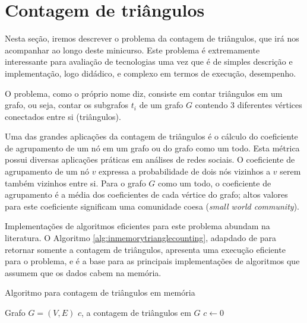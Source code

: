 \section{Contagem de triângulos} \label{triangles}

Nesta seção, iremos descrever o problema da contagem de triângulos, que irá nos acompanhar
ao longo deste minicurso. Este problema é extremamente interessante para avaliação de 
tecnologias uma vez que é de simples descrição e implementação, logo didádico, e complexo
em termos de execução, desempenho.

O problema, como o próprio nome diz, consiste em contar triângulos em um grafo, ou seja,
contar os subgrafos $t_i$ de um grafo $G$ contendo 3 diferentes vértices conectados entre si 
(triângulos). 

Uma das grandes aplicações da contagem de triângulos é o cálculo do coeficiente de agrupamento 
de um nó em um grafo ou do grafo como um todo. Esta métrica possui diversas aplicações práticas 
em análises de redes sociais. O coeficiente de agrupamento de um nó $v$ expressa a probabilidade de 
dois nós vizinhos a $v$ serem também vizinhos entre si. Para o grafo $G$ como um todo, o coeficiente 
de agrupamento é a média dos coeficientes de cada vértice do grafo; altos valores para este coeficiente 
significam uma comunidade coesa (\emph{small world community}).

Implementações de algoritmos eficientes para este problema abundam na literatura. O Algoritmo 
\ref{alg:inmemorytrianglecounting}, adapdado de \cite{Chu2012} para retornar somente a contagem de 
triângulos, apresenta uma execução eficiente para o problema, e é a base para as principais 
implementações de algoritmos que assumem que os dados cabem na memória. 

\begin{algorithm}
\caption{Algoritmo para contagem de triângulos em memória}
\label{alg:inmemorytrianglecounting}
\begin{algorithmic}[1]
    \REQUIRE Grafo $G = (V, E)$
    \ENSURE $c$, a contagem de triângulos em $G$
    \STATE $c \leftarrow 0$
            \ENDFOR
        \ENDFOR
    \ENDFOR 
\end{algorithmic}
\end{algorithm}

